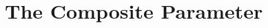\documentclass{article}
\begin{document}
%
%
%





\section{The Composite Parameter} %
\label{sec:the_composite_parameter}
\end{document}
